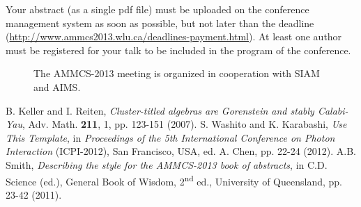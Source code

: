 \documentclass[11pt]{article}
\begin{document}
Your abstract (as a single pdf file) must be uploaded on the conference management
system as soon as possible, but not later than the deadline (\url{http://www.ammcs2013.wlu.ca/deadlines-payment.html}). At least one author must be registered for your talk to be included in the program of the conference.
\begin{figure}[h]

\centerline{}

\caption{\footnotesize The AMMCS-2013 meeting is organized in cooperation with SIAM and AIMS. \normalsize}
\label{fig1}
\end{figure}

\begin{thebibliography}{00}
\setlength{\itemsep}{-1mm}
\footnotesize
{} B. Keller and I. Reiten, \textit{Cluster-titled algebras are Gorenstein and stably Calabi-Yau}, Adv. Math. \textbf{211}, 1, pp. 123-151 (2007).
 S. Washito and K. Karabashi, \textit{Use This Template}, in \textit{Proceedings of the 5th
International Conference on Photon Interaction} (ICPI-2012), San Francisco, USA, ed. A. Chen, pp. 22-24 (2012).
 A.B. Smith, \textit{Describing the style for the AMMCS-2013 book of abstracts}, in C.D. Science (ed.), General Book of Wisdom, 2\textsuperscript{nd} ed., University of Queensland, pp. 23-42 (2011).
\end{thebibliography}
\normalsize
\end{document}
